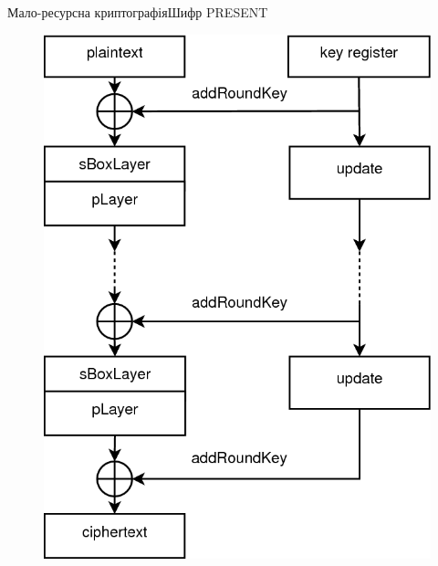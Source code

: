 \documentclass[10pt, ucs, handout]{beamer}
\begin{document}
\begin{frame}{Мало-ресурсна криптографія}{Шифр PRESENT}
\begin{minipage}[t]{0.35\linewidth}
        \begin{figure}[h]
            \centering
            \includegraphics[scale=0.2]{present}
            \label{fig:present}
        \end{figure}
    \end{minipage}
\end{frame}
\end{document}
